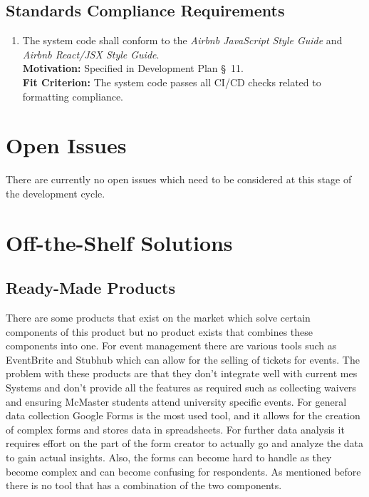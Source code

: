 \documentclass[12pt]{article}
\begin{document}
\subsection{Standards Compliance Requirements}
\begin{enumerate}[align=left,
  leftmargin=*,
  labelsep=1em,
  itemindent=0em,
  label=\bfseries ST-\arabic*:]
  \item The system code shall conform to the \textit{Airbnb JavaScript Style Guide} and \textit{Airbnb React/JSX
    Style Guide}.\\[2mm]
    {\bf Motivation:} Specified in Development Plan \S \ 11.\\
    {\bf Fit Criterion:} The system code passes all CI/CD checks related to formatting compliance.\\
\end{enumerate}

\section{Open Issues}
There are currently no open issues which need to be considered at this stage of the development cycle.
\section{Off-the-Shelf Solutions}
\subsection{Ready-Made Products}
There are some products that exist on the market which solve certain components of this product but no product exists
that combines these components into one. For event management there are various tools such as EventBrite and Stubhub
which can allow for the selling of tickets for events. The problem with these products are that they don't integrate
well with current \gls{mes} Systems and don't provide all the features as required such as collecting waivers and
ensuring McMaster students attend university specific events. For general data collection Google Forms is the most used
tool, and it allows for the creation of complex forms and stores data in spreadsheets. For further data analysis it
requires effort on the part of the form creator to actually go and analyze the data to gain actual insights. Also, the
forms can become hard to handle as they become complex and can become confusing for respondents. As mentioned before
there is no tool that has a combination of the two components.
\end{document}
